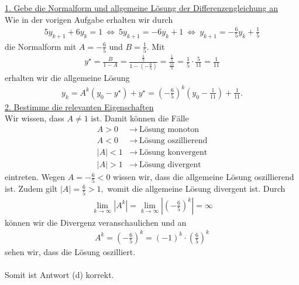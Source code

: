 \underline{1. Gebe die Normalform und allgemeine Lösung der Differenzengleichung an}\\
Wie in der vorigen Aufgabe erhalten wir durch
\begin{align*}
5 y_{k+1} + 6 y_k = 1
\ \Leftrightarrow \
5 y_{k+1} = - 6 y_k + 1
\ \Leftrightarrow \
y_{k+1} = - \frac{6}{5} y_k  + \frac{1}{5}
\end{align*}
die Normalform mit $A =  - \frac{6}{5} $ und $B = \frac{1}{5}$.
Mit 
\begin{align*}
y^\star = 
\frac{B}{1-A} 
= 
\frac{\frac{1}{5}}{1 - \left( -\frac{6}{5} \right)} 
=
\frac{\frac{1}{5}}{\frac{11}{5}}
= \frac{1}{5} \cdot \frac{5}{11} = \frac{1}{11}
\end{align*}
erhalten wir die allgemeine Lösung
\begin{align*}
y_k = A^k (y_0 - y^\star)  + y^\star
= \left( - \frac{6}{5} \right)^k \left ( y_0 - \frac{1}{11}\right) + \frac{1}{11}.
\end{align*}
\newpage
\underline{2. Bestimme die relevanten Eigenschaften}\\
Wir wissen, dass $A\neq 1$ ist.
Damit können die Fälle
\begin{align*}
A > 0 &\rightarrow \ \text{Lösung monoton}\\
A < 0 &\rightarrow \ \text{Lösung oszillierend}\\
|A| < 1  &\rightarrow \ \text{Lösung konvergent}\\
|A| > 1  &\rightarrow \ \text{Lösung divergent}
\end{align*}
eintreten.
Wegen $A = -\frac{6}{5} < 0$ wissen wir, dass die allgemeine Lösung oszillierend ist.
Zudem gilt
$
|A| = \frac{6}{5} > 1,
$
womit die allgemeine Lösung divergent ist.
Durch
\begin{align*}
\lim \limits_{k \to \infty} |A^k | 
=\lim \limits_{k \to \infty} \left| \left( - \frac{6}{5} \right)^k \right| = \infty
\end{align*}
können wir die Divergenz veranschaulichen und an
\begin{align*}
A^k = \left( - \frac{6}{5} \right)^k
= (-1)^k \cdot\left(  \frac{6}{5} \right)^k
\end{align*}
sehen wir, dass die Lösung oszilliert.
\\
\\
Somit ist Antwort (d) korrekt.
\newpage

